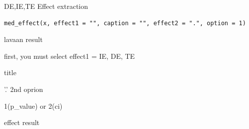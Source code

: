 \documentclass[a4paper]{book}
\begin{document}
%
\begin{Description}
DE,IE,TE Effect extraction
\end{Description}
%
\begin{Usage}
\begin{verbatim}
med_effect(x, effect1 = "", caption = "", effect2 = ".", option = 1)
\end{verbatim}
\end{Usage}
%
\begin{Arguments}
\begin{ldescription}
\item[\code{x}] lavaan result

\item[\code{effect1}] first, you must select effect1 = IE, DE, TE

\item[\code{caption}] title

\item[\code{effect2}] '.' 2nd oprion

\item[\code{option}] 1(p\_value) or 2(ci)
\end{ldescription}
\end{Arguments}
%
\begin{Value}
effect result
\end{Value}
\end{document}
